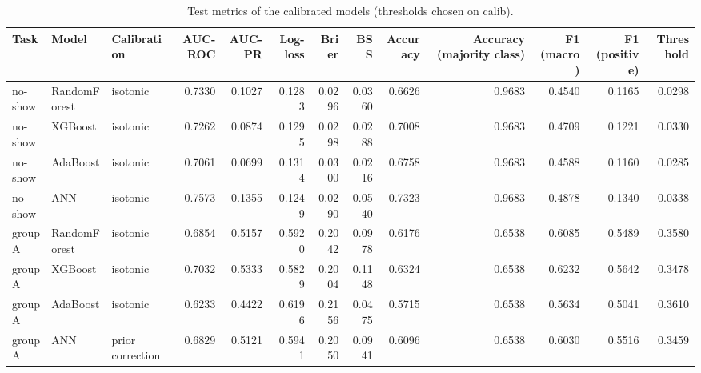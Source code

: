 \begin{table}[htbp]
\caption{Test metrics of the calibrated models (thresholds chosen on calib).}
\label{tab:test-metrics}
\begin{tabular}{lllrrrrrrrrrr}
\toprule
Task & Model & Calibration & AUC-ROC & AUC-PR & Log-loss & Brier & BSS & Accuracy & Accuracy (majority class) & F1 (macro) & F1 (positive) & Threshold \\
\midrule
no-show & RandomForest & isotonic & 0.7330 & 0.1027 & 0.1283 & 0.0296 & 0.0360 & 0.6626 & 0.9683 & 0.4540 & 0.1165 & 0.0298 \\
no-show & XGBoost & isotonic & 0.7262 & 0.0874 & 0.1295 & 0.0298 & 0.0288 & 0.7008 & 0.9683 & 0.4709 & 0.1221 & 0.0330 \\
no-show & AdaBoost & isotonic & 0.7061 & 0.0699 & 0.1314 & 0.0300 & 0.0216 & 0.6758 & 0.9683 & 0.4588 & 0.1160 & 0.0285 \\
no-show & ANN & isotonic & 0.7573 & 0.1355 & 0.1249 & 0.0290 & 0.0540 & 0.7323 & 0.9683 & 0.4878 & 0.1340 & 0.0338 \\
group A & RandomForest & isotonic & 0.6854 & 0.5157 & 0.5920 & 0.2042 & 0.0978 & 0.6176 & 0.6538 & 0.6085 & 0.5489 & 0.3580 \\
group A & XGBoost & isotonic & 0.7032 & 0.5333 & 0.5829 & 0.2004 & 0.1148 & 0.6324 & 0.6538 & 0.6232 & 0.5642 & 0.3478 \\
group A & AdaBoost & isotonic & 0.6233 & 0.4422 & 0.6196 & 0.2156 & 0.0475 & 0.5715 & 0.6538 & 0.5634 & 0.5041 & 0.3610 \\
group A & ANN & prior correction & 0.6829 & 0.5121 & 0.5941 & 0.2050 & 0.0941 & 0.6096 & 0.6538 & 0.6030 & 0.5516 & 0.3459 \\
\bottomrule
\end{tabular}
\end{table}
